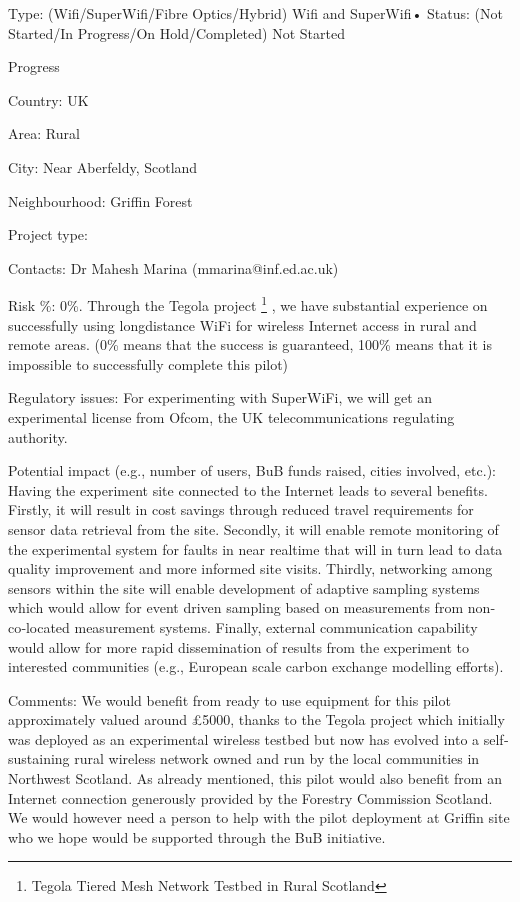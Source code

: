 \documentclass[draftclsnofoot,12pt,journal,onecolumn]{IEEEtran}
\begin{document}
Type: (Wifi/SuperWifi/Fibre Optics/Hybrid) Wifi and SuperWifi• Status: (Not Started/In Progress/On Hold/Completed) Not Started

Progress %

Country: UK

Area: Rural

City: Near Aberfeldy, Scotland

Neighbourhood: Griffin Forest

Project type:

Contacts: Dr Mahesh Marina (mmarina@inf.ed.ac.uk)

Risk \%: 0\%. Through the Tegola project \footnote{Tegola Tiered Mesh Network Testbed in Rural Scotland} , we have substantial experience on successfully
using long­distance WiFi for wireless Internet access in rural and remote areas.
(0\% means that the success is guaranteed, 100\% means that it is
impossible to successfully complete this pilot)

Regulatory issues: For experimenting with SuperWiFi, we will get an experimental license from
Ofcom, the UK telecommunications regulating authority.

Potential impact (e.g., number of users, BuB funds raised, cities
involved, etc.):
Having the experiment site connected to the Internet leads to several benefits. Firstly, it will result
in cost savings through reduced travel requirements for sensor data retrieval from the site.
Secondly, it will enable remote monitoring of the experimental system for faults in near real­time
that will in turn lead to data quality improvement and more informed site visits. Thirdly,
networking among sensors within the site will enable development of adaptive sampling systems
which would allow for event driven sampling based on measurements from non‐co‐located
measurement systems. Finally, external communication capability would allow for more rapid
dissemination of results from the experiment to interested communities (e.g., European scale
carbon exchange modelling efforts).

Comments:
We would benefit from ready to use equipment for this pilot approximately valued around £5000,
thanks to the Tegola project which initially was deployed as an experimental wireless testbed but
now has evolved into a self­sustaining rural wireless network owned and run by the local
communities in Northwest Scotland. As already mentioned, this pilot would also benefit from an
Internet connection generously provided by the Forestry Commission Scotland. We would
however need a person to help with the pilot deployment at Griffin site who we hope would be
supported through the BuB initiative.
\end{document}
